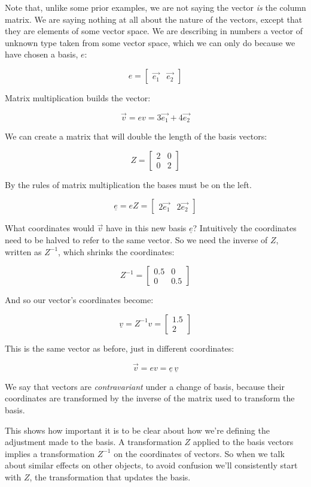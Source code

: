Note that, unlike some prior examples, we are not saying the vector \textit{is} the column matrix. We are saying nothing at all about the nature of the vectors, except that they are elements of some vector space. We are describing in numbers a vector of unknown type taken from some vector space, which we can only do because we have chosen a basis, $e$:

$$e = \begin{bmatrix}\vec{e_1} & \vec{e_2}\end{bmatrix}$$

Matrix multiplication builds the vector:

$$\vec{v} = ev = 3\vec{e_1} + 4\vec{e_2}$$

We can create a matrix that will double the length of the basis vectors:

$$Z = \begin{bmatrix}2 & 0 \\ 0 & 2\end{bmatrix}$$

By the rules of matrix multiplication the bases must be on the left.

$$\underline{e} = eZ = \begin{bmatrix}2\vec{e_1} & 2\vec{e_2}\end{bmatrix}$$

What coordinates would $\vec{v}$ have in this new basis $\underline{e}$? Intuitively the coordinates need to be halved to refer to the same vector. So we need the inverse of $Z$, written as $Z^{-1}$, which shrinks the coordinates:

$$Z^{-1} = \begin{bmatrix}0.5 & 0 \\ 0 & 0.5\end{bmatrix}$$

And so our vector's coordinates become:

$$\underline{v} = Z^{-1}v = \begin{bmatrix}1.5 \\ 2\end{bmatrix}$$

This is the same vector as before, just in different coordinates:

$$\vec{v} = ev = \underline{e} \, \underline{v}$$

We say that vectors are \textit{contravariant} under a change of basis, because their coordinates are transformed by the inverse of the matrix used to transform the basis.

This shows how important it is to be clear about how we're defining the adjustment made to the basis. A transformation $Z$ applied to the basis vectors implies a transformation $Z^{-1}$ on the coordinates of vectors. So when we talk about similar effects on other objects, to avoid confusion we'll consistently start with $Z$, the transformation that updates the basis.

